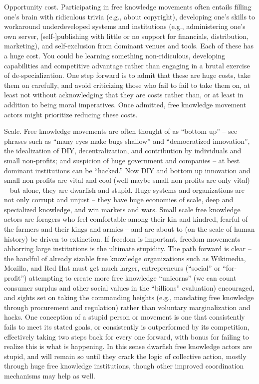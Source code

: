 Opportunity cost. Participating in free knowledge movements often
entails filling one's brain with ridiculous trivia (e.g., about
copyright), developing one's skills to workaround underdeveloped systems
and institutions (e.g., administering one's own server,
{[}self-{]}publishing with little or no support for financials,
distribution, marketing), and self-exclusion from dominant venues and
tools. Each of these has a huge cost. You could be learning something
non-ridiculous, developing capabilities and competitive advantage rather
than engaging in a brutal exercise of de-specialization. One step
forward is to admit that these are huge costs, take them on carefully,
and avoid criticizing those who fail to fail to take them on, at least
not without acknowledging that they are costs rather than, or at least
in addition to being moral imperatives. Once admitted, free knowledge
movement actors might prioritize reducing these costs.

Scale. Free knowledge movements are often thought of as ``bottom up'' --
see phrases such as ``many eyes make bugs shallow'' and ``democratized
innovation'', the idealization of DIY, decentralization, and
contribution by individuals and small non-profits; and suspicion of huge
government and companies -- at best dominant institutions can be
``hacked.'' Now DIY and bottom up innovation and small non-profits are
vital and cool (well maybe small non-profits are only vital) -- but
alone, they are dwarfish and stupid. Huge systems and organizations are
not only corrupt and unjust -- they have huge economies of scale, deep
and specialized knowledge, and win markets and wars. Small scale free
knowledge actors are foragers who feel comfortable among their kin and
kindred, fearful of the farmers and their kings and armies -- and are
about to (on the scale of human history) be driven to extinction. If
freedom is important, freedom movements abhorring large institutions is
the ultimate stupidity. The path forward is clear -- the handful of
already sizable free knowledge organizations such as Wikimedia, Mozilla,
and Red Hat must get much larger, entrepreneurs (``social'' or
``for-profit'') attempting to create more free knowledge ``unicorns''
(we can count consumer surplus and other social values in the
``billions'' evaluation) encouraged, and sights set on taking the
commanding heights (e.g., mandating free knowledge through procurement
and regulation) rather than voluntary marginalization and hacks. One
conception of a stupid person or movement is one that consistently fails
to meet its stated goals, or consistently is outperformed by its
competition, effectively taking two steps back for every one forward,
with bonus for failing to realize this is what is happening. In this
sense dwarfish free knowledge actors are stupid, and will remain so
until they crack the logic of collective action, mostly through huge
free knowledge institutions, though other improved coordination
mechanisms may help as well.

